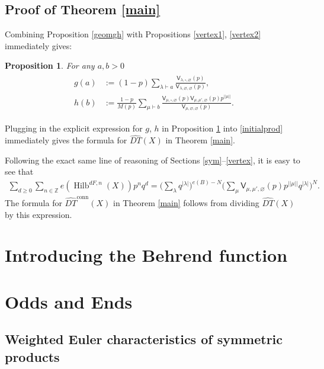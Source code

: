 \documentclass{amsart}
\newtheorem{proposition}[theorem]{Proposition}
\theoremstyle{definition}
\newcommand{\ZZ} {\mathbb{Z}}		%
\newcommand{\sfV}{\mathsf{V}}
\newcommand{\Hilb}{\operatorname{Hilb}}
\newcommand{\conn}{\operatorname{conn}}
\begin{document}
\subsection{Proof of Theorem \ref{main}}

Combining Proposition \ref{geomgh} with Propositions \ref{vertex1}, \ref{vertex2} immediately gives:
\begin{proposition} \label{combgh}
For any $a,b>0$ 
\begin{align}
\begin{split} \label{gh}
g(a) &:= (1-p) \sum_{\lambda \vdash a} \frac{\sfV_{\lambda,\square,\varnothing}(p)}{\sfV_{\lambda,\varnothing,\varnothing}(p)}, \\
h(b) &:= \frac{1-p}{M(p)} \sum_{\mu \vdash b} \frac{\sfV_{\mu,\square,\varnothing}(p) \sfV_{\mu,\mu',\varnothing}(p) p^{|\!|\mu|\!|}}{\sfV_{\mu,\varnothing,\varnothing}(p)}.
\end{split}
\end{align}
\end{proposition}

Plugging in the explicit expression for $g$, $h$ in Proposition \ref{combgh} into \eqref{initialprod} immediately gives the formula for $\widehat{DT}(X)$ in Theorem \ref{main}.

Following the exact same line of reasoning of Sections \ref{sym}--\ref{vertex}, it is easy to see that
\begin{align*}
\sum_{d \geq 0} \sum_{n \in \ZZ} e(\Hilb^{dF,n}(X)) p^n q^d = \Bigg( \sum_{\lambda} q^{|\lambda|} \Bigg)^{e(B) - N} \Bigg( \sum_{\mu} \sfV_{\mu,\mu',\varnothing}(p) p^{|\!|\mu|\!|} q^{|\lambda|} \Bigg)^{N}.
\end{align*}
The formula for $\widehat{DT}^{\conn}(X)$ in Theorem \ref{main} follows from dividing $\widehat{DT}(X)$ by this expression.


\section{Introducing the Behrend function}


\appendix
\section{Odds and Ends}\label{appendix: odds and ends}


\subsection{Weighted Euler characteristics of symmetric products}
\end{document}
